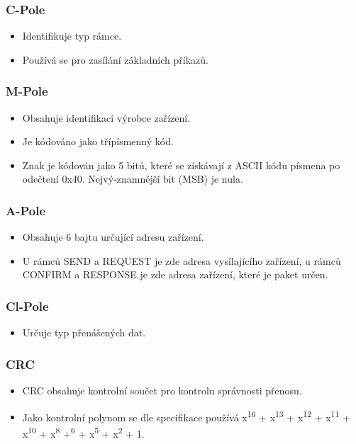 \subsubsection{C-Pole}
\begin{itemize}
	\item Identifikuje typ rámce.
	\item Používá se pro zasílání základních příkazů.
\end{itemize}

\subsubsection{M-Pole}
\begin{itemize}
	\item Obsahuje identifikaci výrobce zařízení.
	\item Je kódováno jako třípísmenný kód.
	\item Znak je kódován jako 5 bitů, které se získávají z ASCII kódu písmena po odečtení 0x40. Nejvý-znamnější bit (MSB) je nula.
\end{itemize}

\subsubsection{A-Pole}
\begin{itemize}
	\item Obsahuje 6 bajtu určující adresu zařízení.
	\item U rámců SEND a REQUEST je zde adresa vysílajícího zařízení, u rámců CONFIRM a RESPONSE je zde adresa zařízení, které je paket určen.
\end{itemize}

\subsubsection{Cl-Pole}
\begin{itemize}
	\item Určuje typ přenášených dat.
\end{itemize}



\subsubsection{CRC}
\begin{itemize}
	\item CRC obsahuje kontrolní součet pro kontrolu správnosti přenosu. 
	\item Jako kontrolní polynom se dle specifikace používá x\textsuperscript{16} + x\textsuperscript{13} + x\textsuperscript{12} + x\textsuperscript{11} + x\textsuperscript{10} + x\textsuperscript{8} +\textsuperscript{6} + x\textsuperscript{5} + x\textsuperscript{2} + 1.
\end{itemize}


